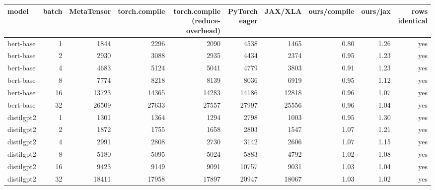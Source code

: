\begin{tabular}{lrrrrrrrrr}
\toprule
model & batch & MetaTensor & torch.compile & torch.compile (reduce-overhead) & PyTorch eager & JAX/XLA & ours/compile & ours/jax & rows identical \\
\midrule
bert-base & 1 & 1844 & 2296 & 2090 & 4538 & 1465 & 0.80 & 1.26 & yes \\
bert-base & 2 & 2930 & 3088 & 2935 & 4434 & 2374 & 0.95 & 1.23 & yes \\
bert-base & 4 & 4683 & 5124 & 5041 & 4779 & 3803 & 0.91 & 1.23 & yes \\
bert-base & 8 & 7774 & 8218 & 8139 & 8036 & 6919 & 0.95 & 1.12 & yes \\
bert-base & 16 & 13723 & 14365 & 14283 & 14186 & 12818 & 0.96 & 1.07 & yes \\
bert-base & 32 & 26509 & 27633 & 27557 & 27997 & 25556 & 0.96 & 1.04 & yes \\
distilgpt2 & 1 & 1301 & 1364 & 1294 & 2798 & 1003 & 0.95 & 1.30 & yes \\
distilgpt2 & 2 & 1872 & 1755 & 1658 & 2803 & 1547 & 1.07 & 1.21 & yes \\
distilgpt2 & 4 & 2991 & 2808 & 2730 & 3142 & 2606 & 1.07 & 1.15 & yes \\
distilgpt2 & 8 & 5180 & 5095 & 5024 & 5883 & 4792 & 1.02 & 1.08 & yes \\
distilgpt2 & 16 & 9423 & 9149 & 9091 & 10757 & 9031 & 1.03 & 1.04 & yes \\
distilgpt2 & 32 & 18411 & 17958 & 17897 & 20947 & 18067 & 1.03 & 1.02 & yes \\
\bottomrule
\end{tabular}
